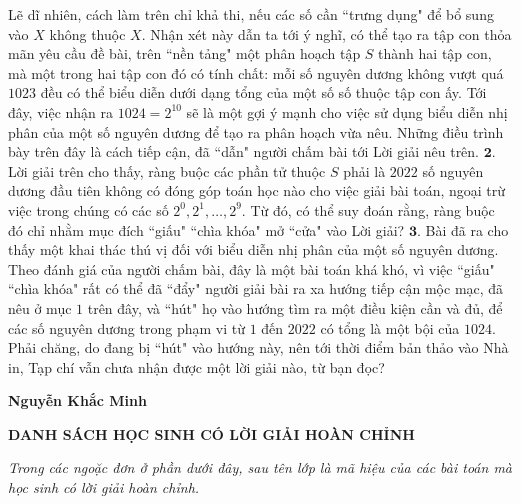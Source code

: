 \begin{multicols}{2}
	\vskip 0.05cm
	Lẽ dĩ nhiên, cách làm trên chỉ khả thi, nếu các số cần ``trưng dụng" để bổ sung vào $X$ không thuộc $X$. Nhận xét này dẫn ta tới ý nghĩ, có thể tạo ra tập con thỏa mãn yêu cầu đề bài, trên ``nền tảng" một phân hoạch tập $S$ thành hai tập con, mà một trong hai tập con đó có tính chất: mỗi số nguyên dương không vượt quá $1023$ đều có thể biểu diễn dưới dạng tổng của một số số thuộc tập con ấy. Tới đây, việc nhận ra  $1024 = 2^{10}$ sẽ là một gợi ý mạnh cho việc sử dụng biểu diễn nhị phân của một số nguyên dương để tạo ra phân hoạch vừa nêu.
	\vskip 0.05cm
	Những điều trình bày trên đây là cách tiếp cận, đã ``dẫn" người chấm bài tới Lời giải nêu trên.
	\vskip 0.05cm
	$\pmb{2.}$ Lời giải trên cho thấy, ràng buộc các phần tử thuộc $S$ phải là $2022$ số nguyên dương đầu tiên không có đóng góp toán học nào cho việc giải bài toán, ngoại trừ việc trong chúng có các số  $2^0, 2^1, \ldots, 2^9$. Từ đó, có thể suy đoán rằng, ràng buộc đó chỉ nhằm mục đích ``giấu" ``chìa khóa" mở ``cửa" vào Lời giải?
	\vskip 0.05cm
	$\pmb{3.}$ Bài đã ra cho thấy một khai thác thú vị đối với biểu diễn nhị phân của một số nguyên dương. Theo đánh giá của người chấm bài, đây là một bài toán khá khó, vì việc ``giấu" ``chìa khóa" rất có thể đã ``đẩy" người giải bài ra xa hướng tiếp cận mộc mạc, đã nêu ở mục $1$ trên đây, và ``hút" họ vào hướng tìm ra một điều kiện cần và đủ, để các số nguyên dương trong phạm vi từ $1$ đến $2022$ có tổng là một bội của $1024$. Phải chăng, do đang bị ``hút" vào hướng này, nên tới thời điểm bản thảo vào Nhà in, Tạp chí vẫn chưa nhận được một lời giải nào, từ bạn đọc?
	\begin{flushright}
		\textbf{\color{thachthuctoanhoc}Nguyễn Khắc Minh}
	\end{flushright}
\end{multicols}
\centerline{\textbf{\color{thachthuctoanhoc}DANH SÁCH HỌC SINH CÓ LỜI GIẢI HOÀN CHỈNH}}
\vskip 0.2cm
\textit{Trong các ngoặc đơn ở phần dưới đây, sau tên lớp là mã hiệu của các bài toán mà học sinh có lời giải hoàn chỉnh.}
